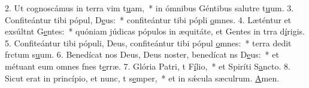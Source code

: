 2. Ut cognoscámus in terra vim t\uline{u}am,~* in ómnibus Géntibus salutre t\uline{u}um.
3. Confiteántur tibi pópul, D\uline{e}us:~* confiteántur tibi pópli \uline{o}mnes.
4. Læténtur et exsúltnt G\uline{e}ntes:~* quóniam júdicas pópulos in æquitáte, et Gentes in trra d\uline{í}rigis.
5. Confiteántur tibi pópuli, Deus, confiteántur tibi pópul \uline{o}mnes:~* terra dedit frctum s\uline{u}um.
6. Benedícat nos Deus, Deus noster, benedícat ns D\uline{e}us:~* et métuant eum omnes fnes t\uline{e}rræ.
7. Glória Patri, t F\uline{í}lio,~* et Spiríti S\uline{a}ncto.
8. Sicut erat in princípio, et nunc, t s\uline{e}mper,~* et in sǽcula sæculrum. \uline{A}men.
